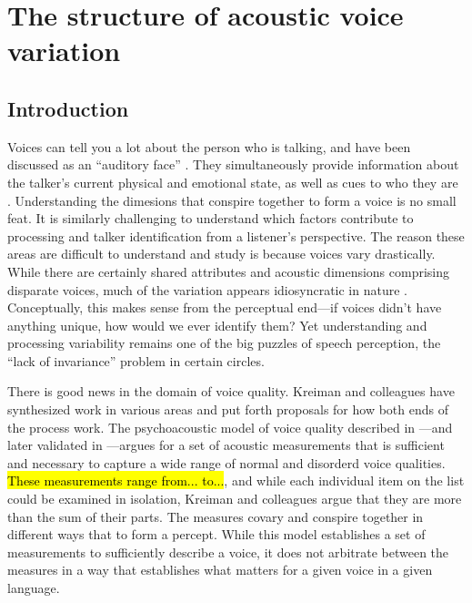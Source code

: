\setcounter{chapter}{2}
\chapter{The structure of acoustic voice variation}
\label{ch3:Voice}



\section{Introduction}\label{ch3:sec:introduction}
Voices can tell you a lot about the person who is talking, and have been discussed as an ``auditory face'' \citep{belin_2004_voice}. They simultaneously provide information about the talker's current physical and emotional state, as well as cues to who they are \citep{belin_2004_voice}. Understanding the dimesions that conspire together to form a voice is no small feat. It is similarly challenging to understand which factors contribute to processing and talker identification from a listener's perspective. The reason these areas are difficult to understand and study is because voices vary drastically. While there are certainly shared attributes and acoustic dimensions comprising disparate voices, much of the variation appears idiosyncratic in nature \citep{lee_2019_acoustic}. Conceptually, this makes sense from the perceptual end---if voices didn't have anything unique, how would we ever identify them? Yet understanding and processing variability remains one of the big puzzles of speech perception, the ``lack of invariance'' problem in certain circles. 

There is good news in the domain of voice quality. Kreiman and colleagues have synthesized work in various areas and put forth proposals for how both ends of the process work. The psychoacoustic model of voice quality described in \citep{kreiman_2014_theory}---and later validated in \citep{kreiman_2021_validating}---argues for a set of acoustic measurements that is sufficient and necessary to capture a wide range of normal and disorderd voice qualities. \hl{These measurements range from... to...}, and while each individual item on the list could be examined in isolation, Kreiman and colleagues argue that they are more than the sum of their parts. The measures covary and conspire together in different ways that to form a percept. While this model establishes a set of measurements to sufficiently describe a voice, it does not arbitrate between the measures in a way that establishes what matters for a given voice in a given language. 

